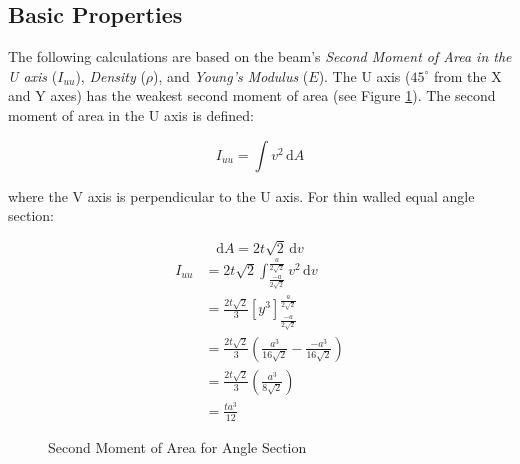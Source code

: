 \documentclass[12pt]{article} %
\begin{document}
\begin{appendices}
\subsection{Basic Properties}
The following calculations are based on the beam's \emph{Second Moment of Area
in the U axis} ($I_{uu}$), \emph{Density} ($\rho$), and \emph{Young's Modulus}
($E$).  The U axis ($45^\circ$ from the X and Y axes) has the weakest second
moment of area (see Figure \ref{fig:iangle}).  The second moment of area in the
U axis is defined:

$$ I_{uu} = \int \! v^2 \, \mathrm{d}A $$

where the V axis is perpendicular to the U axis.  For thin walled equal angle
section:

$$ \mathrm{d}A = 2 t \sqrt{2} \, \mathrm{d}v $$
\begin{align*}
I_{uu} &= 2 t \sqrt{2} \int_{\frac{-a}{2\sqrt{2}}}^{\frac{a}{2\sqrt{2}}}
\! v^2 \, \mathrm{d}v \\
       &= \frac{2t\sqrt{2}}{3} \left[ y^3 \right]_{\frac{-a}{2\sqrt{2}}}
          ^{\frac{a}{2\sqrt{2}}} \\
       &= \frac{2t\sqrt{2}}{3} \left( \frac{a^3}{16\sqrt{2}} -
          \frac{-a^3}{16\sqrt{2}} \right) \\
       &= \frac{2t\sqrt{2}}{3} \left( \frac{a^3}{8\sqrt{2}} \right) \\
       &= \frac{ta^3}{12}
\end{align*}

\begin{figure}[h]
    \centering
    \caption{Second Moment of Area for Angle Section}
    \label{fig:iangle}
\end{figure}


\end{appendices}
\end{document}
